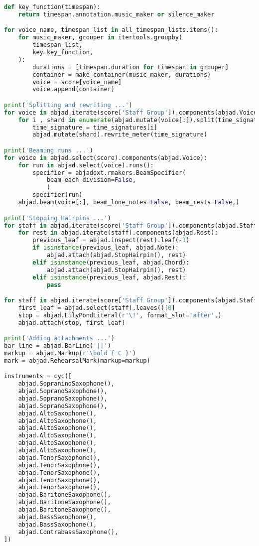 \begin{lstlisting}[language=Python, caption=Invocation Source Code]
def key_function(timespan):
    return timespan.annotation.music_maker or silence_maker

for voice_name, timespan_list in all_timespan_lists.items():
    for music_maker, grouper in itertools.groupby(
        timespan_list,
        key=key_function,
    ):
        durations = [timespan.duration for timespan in grouper]
        container = make_container(music_maker, durations)
        voice = score[voice_name]
        voice.append(container)

print('Splitting and rewriting ...')
for voice in abjad.iterate(score['Staff Group']).components(abjad.Voice):
    for i , shard in enumerate(abjad.mutate(voice[:]).split(time_signatures)):
        time_signature = time_signatures[i]
        abjad.mutate(shard).rewrite_meter(time_signature)

print('Beaming runs ...')
for voice in abjad.select(score).components(abjad.Voice):
    for run in abjad.select(voice).runs():
        specifier = abjadext.rmakers.BeamSpecifier(
            beam_each_division=False,
            )
        specifier(run)
    abjad.beam(voice[:], beam_lone_notes=False, beam_rests=False,)

print('Stopping Hairpins ...')
for staff in abjad.iterate(score['Staff Group']).components(abjad.Staff):
    for rest in abjad.iterate(staff).components(abjad.Rest):
        previous_leaf = abjad.inspect(rest).leaf(-1)
        if isinstance(previous_leaf, abjad.Note):
            abjad.attach(abjad.StopHairpin(), rest)
        elif isinstance(previous_leaf, abjad.Chord):
            abjad.attach(abjad.StopHairpin(), rest)
        elif isinstance(previous_leaf, abjad.Rest):
            pass

for staff in abjad.iterate(score['Staff Group']).components(abjad.Staff):
    first_leaf = abjad.select(staff).leaves()[0]
    stop = abjad.LilyPondLiteral(r'\!', format_slot='after',)
    abjad.attach(stop, first_leaf)

print('Adding attachments ...')
bar_line = abjad.BarLine('||')
markup = abjad.Markup(r'\bold { C }')
mark = abjad.RehearsalMark(markup=markup)

instruments = cyc([
    abjad.SopraninoSaxophone(),
    abjad.SopranoSaxophone(),
    abjad.SopranoSaxophone(),
    abjad.SopranoSaxophone(),
    abjad.AltoSaxophone(),
    abjad.AltoSaxophone(),
    abjad.AltoSaxophone(),
    abjad.AltoSaxophone(),
    abjad.AltoSaxophone(),
    abjad.AltoSaxophone(),
    abjad.TenorSaxophone(),
    abjad.TenorSaxophone(),
    abjad.TenorSaxophone(),
    abjad.TenorSaxophone(),
    abjad.TenorSaxophone(),
    abjad.BaritoneSaxophone(),
    abjad.BaritoneSaxophone(),
    abjad.BaritoneSaxophone(),
    abjad.BassSaxophone(),
    abjad.BassSaxophone(),
    abjad.ContrabassSaxophone(),
])


\end{lstlisting}
